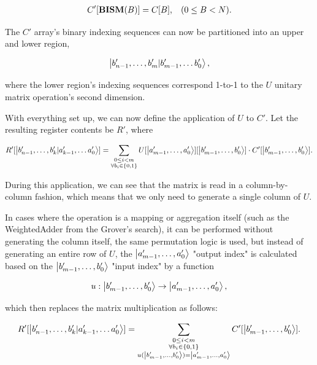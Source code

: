 \begin{align*}
C'[\text{\textbf{BISM}}(B)] = C[B], \hspace{3mm}(0\leq{}B<N).
\end{align*}

The $C'$ array's binary indexing sequences can now be partitioned into an upper and lower region,

\begin{align*}
\ket{b'_{n-1},\dots{},b'_{m}|b'_{m-1},\dots{}b'_0},
\end{align*}

where the lower region's indexing sequences correspond 1-to-1 to the $U$ unitary matrix operation's second dimension.

With everything set up, we can now define the application of $U$ to $C'$. Let the resulting register contents be $R'$, where

\begin{align}
\label{RowGenEq}
R'[\ket{b'_{n-1},\dots{},b'_{k}|a'_{k-1},\dots{}a'_0}] = \sum\limits_{\substack{0\leq{}i<m \\ \forall{}b_i\in{}\{0,1\}}}U[\ket{a'_{m-1},\dots{},a'_0}][\ket{b'_{m-1},\dots{},b'_0}] \cdot{} C'[\ket{b'_{m-1},\dots{},b'_0}].
\end{align}

During this application, we can see that the matrix is read in a column-by-column fashion, which means that we only need to generate a single column of $U$.

In cases where the operation is a mapping or aggregation itself (such as the WeightedAdder from the Grover's search), it can be performed without generating the column itself, the same permutation logic is used, but instead of generating an entire row of $U$, the $\ket{a'_{m-1},\dots{},a'_0}$ "output index" is calculated based on the $\ket{b'_{m-1},\dots{},b'_0}$ "input index" by a function

\begin{align*}
    u: \ket{b'_{m-1},\dots{},b'_0} \rightarrow \ket{a'_{m-1},\dots{},a'_0},
\end{align*}

which then replaces the matrix multiplication as follows:

\begin{align}
\label{NoGenEq}
R'[\ket{b'_{n-1},\dots{},b'_{k}|a'_{k-1},\dots{}a'_0}] =
\sum\limits_{\substack{0\leq{}i<m \\ \forall{}b_i\in{}\{0,1\}\\ u(\ket{b'_{m-1},\dots{},b'_0}) =
\ket{a'_{m-1},\dots{},a'_0}}}C'[\ket{b'_{m-1},\dots{},b'_0}].
\end{align}

